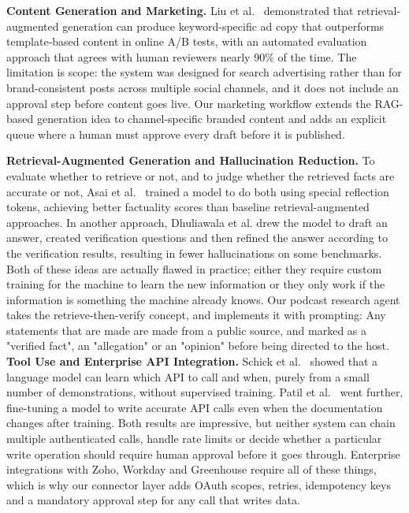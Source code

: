 \vspace{10pt}
\noindent\textbf{Content Generation and Marketing.}
Liu et al.\ \cite{marketingfm} demonstrated that retrieval-augmented generation can produce keyword-specific ad copy that outperforms template-based content in online A/B tests, with an automated evaluation approach that agrees with human reviewers nearly 90\% of the time. The limitation is scope: the system was designed for search advertising rather than for brand-consistent posts across multiple social channels, and it does not include an approval step before content goes live. Our marketing workflow extends the RAG-based generation idea to channel-specific branded content and adds an explicit queue where a human must approve every draft before it is published.

\vspace{10pt}
\noindent\textbf{Retrieval-Augmented Generation and Hallucination Reduction.}
To evaluate whether to retrieve or not, and to judge whether the retrieved facts are accurate or not, Asai et al.\ \cite{selfrag} trained a model to do both using special reflection tokens, achieving better factuality scores than baseline retrieval-augmented approaches. In another approach, Dhuliawala et al. \cite{cove} drew the model to draft an answer, created verification questions and then refined the answer according to the verification results, resulting in fewer hallucinations on some benchmarks. Both of these ideas are actually flawed in practice; either they require custom training for the machine to learn the new information or they only work if the information is something the machine already knows. Our podcast research agent takes the retrieve-then-verify concept, and implements it with prompting: Any statements that are made are made from a public source, and marked as a "verified fact", an "allegation" or an "opinion" before being directed to the host.
\vspace{10pt}
\noindent\textbf{Tool Use and Enterprise API Integration.}
Schick et al.\ \cite{toolformer} showed that a language model can learn which API to call and when, purely from a small number of demonstrations, without supervised training. Patil et al.\ \cite{gorilla} went further, fine-tuning a model to write accurate API calls even when the documentation changes after training. Both results are impressive, but neither system can chain multiple authenticated calls, handle rate limits or decide whether a particular write operation should require human approval before it goes through. Enterprise integrations with Zoho, Workday and Greenhouse require all of these things, which is why our connector layer adds OAuth scopes, retries, idempotency keys and a mandatory approval step for any call that writes data.

